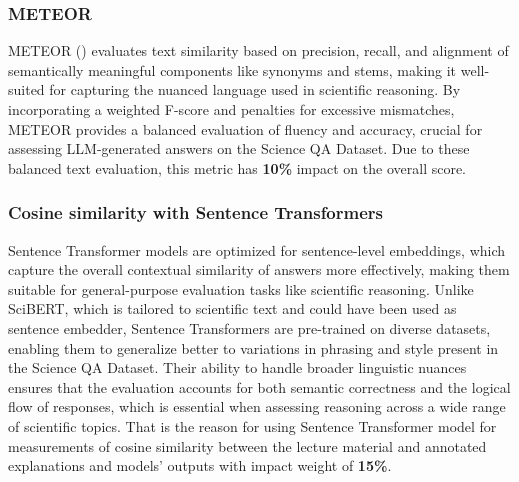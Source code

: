 \documentclass{article}
\begin{document}
\subsubsection{METEOR}
METEOR (\cite{banerjee2005meteor}) evaluates text similarity based on precision, recall, and alignment of semantically meaningful components like synonyms and stems, making it well-suited for capturing the nuanced language used in scientific reasoning.
By incorporating a weighted F-score and penalties for excessive mismatches, METEOR provides a balanced evaluation of fluency and accuracy, crucial for assessing LLM-generated answers on the Science QA Dataset. Due to these balanced text evaluation, this metric has \textbf{10\%} impact on the overall score.

\subsubsection{Cosine similarity with Sentence Transformers}
Sentence Transformer models are optimized for sentence-level embeddings, which capture the overall contextual similarity of answers more effectively, making them suitable for general-purpose evaluation tasks like scientific reasoning.
Unlike SciBERT, which is tailored to scientific text and could have been used as sentence embedder, Sentence Transformers are pre-trained on diverse datasets, enabling them to generalize better to variations in phrasing and style present in the Science QA Dataset.
Their ability to handle broader linguistic nuances ensures that the evaluation accounts for both semantic correctness and the logical flow of responses, which is essential when assessing reasoning across a wide range of scientific topics. That is the reason for using Sentence Transformer model for measurements of cosine similarity between the lecture material and annotated explanations and models' outputs with impact weight of \textbf{15\%}.
\end{document}
